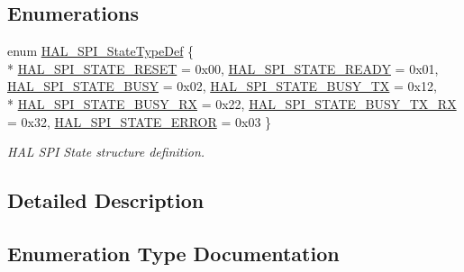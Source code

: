 \subsection*{Enumerations}
\begin{DoxyCompactItemize}
\item 
enum \hyperlink{group___s_p_i___exported___types_ga8891cb64e76198a860172d94c638c9b4}{H\+A\+L\+\_\+\+S\+P\+I\+\_\+\+State\+Type\+Def} \{ \\*
\hyperlink{group___s_p_i___exported___types_gga8891cb64e76198a860172d94c638c9b4adbc218df2c9841b561282b40b3ded69d}{H\+A\+L\+\_\+\+S\+P\+I\+\_\+\+S\+T\+A\+T\+E\+\_\+\+R\+E\+S\+ET} = 0x00, 
\hyperlink{group___s_p_i___exported___types_gga8891cb64e76198a860172d94c638c9b4abb3992c67a15c14bd1808ef6b63fa926}{H\+A\+L\+\_\+\+S\+P\+I\+\_\+\+S\+T\+A\+T\+E\+\_\+\+R\+E\+A\+DY} = 0x01, 
\hyperlink{group___s_p_i___exported___types_gga8891cb64e76198a860172d94c638c9b4a0635e168bc0430253fe8e74cfe9768fd}{H\+A\+L\+\_\+\+S\+P\+I\+\_\+\+S\+T\+A\+T\+E\+\_\+\+B\+U\+SY} = 0x02, 
\hyperlink{group___s_p_i___exported___types_gga8891cb64e76198a860172d94c638c9b4a5d82b644c7ca656ab5fe8a8e3cbc29ab}{H\+A\+L\+\_\+\+S\+P\+I\+\_\+\+S\+T\+A\+T\+E\+\_\+\+B\+U\+S\+Y\+\_\+\+TX} = 0x12, 
\\*
\hyperlink{group___s_p_i___exported___types_gga8891cb64e76198a860172d94c638c9b4afd7e00128aca1feaa099c2595ffb9277}{H\+A\+L\+\_\+\+S\+P\+I\+\_\+\+S\+T\+A\+T\+E\+\_\+\+B\+U\+S\+Y\+\_\+\+RX} = 0x22, 
\hyperlink{group___s_p_i___exported___types_gga8891cb64e76198a860172d94c638c9b4a9dae2883ae3e43ca28afc9453a14c938}{H\+A\+L\+\_\+\+S\+P\+I\+\_\+\+S\+T\+A\+T\+E\+\_\+\+B\+U\+S\+Y\+\_\+\+T\+X\+\_\+\+RX} = 0x32, 
\hyperlink{group___s_p_i___exported___types_gga8891cb64e76198a860172d94c638c9b4a3cba266d2346abe3b62fa0acccab4711}{H\+A\+L\+\_\+\+S\+P\+I\+\_\+\+S\+T\+A\+T\+E\+\_\+\+E\+R\+R\+OR} = 0x03
 \}\begin{DoxyCompactList}\small\item\em H\+AL S\+PI State structure definition. \end{DoxyCompactList}
\end{DoxyCompactItemize}


\subsection{Detailed Description}


\subsection{Enumeration Type Documentation}

